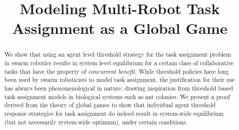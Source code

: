 \documentclass[conference]{ieeeconf}
\begin{document}
\title{Modeling Multi-Robot Task Assignment as a Global Game}

\author{
\and
{}
}

\maketitle

\begin{abstract}
We show that using an agent level threshold strategy for the task assignment problem in swarm robotics results in system level equilibrium for a certain class of collaborative tasks that have the property of \emph{concurrent benefit}. While threshold policies have long been used by swarm roboticists to model task assignment, the justification for their use has always been phenomenological in nature; drawing inspiration from threshold based task assignment models in biological systems such as ant colonies. We present a proof derived from the theory of global games to show that individual agent threshold response strategies for task assignment do indeed result in system-wide equilibrium (but not necessarily system-wide optimum), under certain conditions.
\end{abstract}

\IEEEpeerreviewmaketitle

\end{document}
